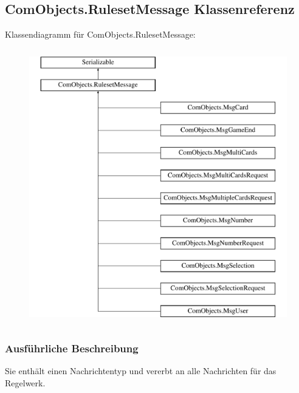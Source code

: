 \hypertarget{a00075}{\subsection{Com\-Objects.\-Ruleset\-Message Klassenreferenz}
\label{a00075}
}
Klassendiagramm für Com\-Objects.\-Ruleset\-Message\-:\begin{figure}[H]
\begin{center}
\leavevmode
\includegraphics[height=12.000000cm]{a00075}
\end{center}
\end{figure}


\subsubsection{Ausführliche Beschreibung}
Sie enthält einen Nachrichtentyp und vererbt an alle Nachrichten für das Regelwerk. 